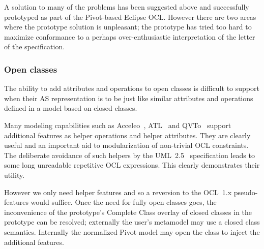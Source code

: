 \documentclass{jot}
\begin{document}
A solution to many of the problems has been suggested above and successfully prototyped as part of the Pivot-based Eclipse OCL. However there are two areas where the prototype solution is unpleasant; the prototype has tried too hard to maximize conformance to a perhaps over-enthusiastic interpretation of the letter of the specification.


 

\subsubsection{Open classes}

The ability to add attributes and operations to open classes is difficult to support when their AS representation is to be just like similar attributes and operations defined in a model based on closed classes.

Many modeling capabilities such as Acceleo~\cite{Eclipse-Acceleo}, ATL~\cite{Eclipse-ATL} and QVTo~\cite{Eclipse-QVTo} support additional features as helper operations and helper attributes. They are clearly useful and an important aid to modularization of non-trivial OCL constraints. The deliberate avoidance of such helpers by the UML~2.5~\cite{UML-2.5} specification leads to some long unreadable repetitive OCL expressions. This clearly demonstrates their utility.

However we only need helper features and so a reversion to the OCL~1.x pseudo-features would suffice. Once the need for fully open classes goes, the inconvenience of the prototype's Complete Class overlay of closed classes in the prototype can be resolved; externally the user's metamodel may use a closed class semantics. Internally the normalized Pivot model may open the class to inject the additional features.
\end{document}
